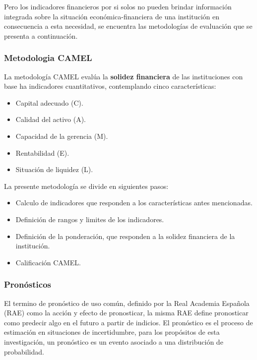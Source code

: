 \documentclass[
  12pt,
]{article}
\providecommand{\tightlist}{%
  \setlength{\itemsep}{0pt}\setlength{\parskip}{0pt}}
\begin{document}
Pero los indicadores financieros por si solos no pueden brindar
información integrada sobre la situación económica-financiera de una
institución en consecuencia a esta necesidad, se encuentra las
metodologías de evaluación que se presenta a continuación.

\hypertarget{metodologia-camel}{%
\subsubsection{Metodologia CAMEL}\label{metodologia-camel}}

La metodología CAMEL evalúa la \textbf{solidez financiera} de las
instituciones con base ha indicadores cuantitativos, contemplando cinco
características:

\begin{itemize}
\tightlist
\item
  Capital adecuado (C).
\item
  Calidad del activo (A).
\item
  Capacidad de la gerencia (M).
\item
  Rentabilidad (E).
\item
  Situación de liquidez (L).
\end{itemize}

La presente metodología se divide en siguientes pasos:

\begin{itemize}
\tightlist
\item
  Calculo de indicadores que responden a los características antes
  mencionadas.
\item
  Definición de rangos y limites de los indicadores.
\item
  Definición de la ponderación, que responden a la solidez financiera de
  la institución.
\item
  Calificación CAMEL.
\end{itemize}

\hypertarget{pronuxf3sticos}{%
\subsubsection{Pronósticos}\label{pronuxf3sticos}}

El termino de pronóstico de uso común, definido por la Real Academia
Española (RAE) como la acción y efecto de pronosticar, la misma RAE
define pronosticar como predecir algo en el futuro a partir de indicios.
El pronóstico es el proceso de estimación en situaciones de
incertidumbre, para los propósitos de esta investigación, un pronóstico
es un evento asociado a una distribución de probabilidad.
\end{document}
